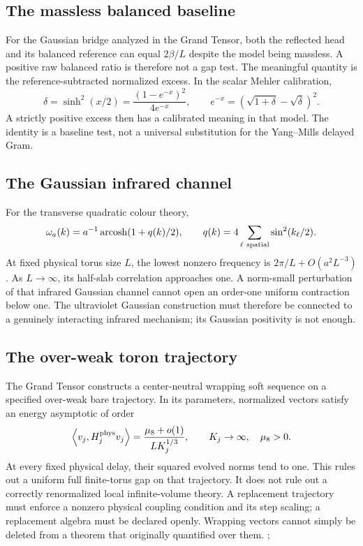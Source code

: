 \documentclass[11pt,oneside,openany]{book}
\theoremstyle{definition}
\theoremstyle{remark}
\newcommand{\ip}[2]{\left\langle#1,#2\right\rangle}
\newcommand{\src}[2]{\cite[#2]{#1}}
\begin{document}
\subsection{The massless balanced baseline}
For the Gaussian bridge analyzed in the Grand Tensor, both the reflected head and its balanced reference can equal $2\beta/L$ despite the model being massless. A positive raw balanced ratio is therefore not a gap test. The meaningful quantity is the reference-subtracted normalized excess. In the scalar Mehler calibration,
\[
\delta=\sinh^2(x/2)=\frac{(1-e^{-x})^2}{4e^{-x}},
\qquad
e^{-x}=(\sqrt{1+\delta}-\sqrt\delta)^2.
\]
A strictly positive excess then has a calibrated meaning in that model. The identity is a baseline test, not a universal substitution for the Yang--Mills delayed Gram. \cite{GT}

\subsection{The Gaussian infrared channel}
For the transverse quadratic colour theory,
\[
\omega_a(k)=a^{-1}\operatorname{arcosh}(1+q(k)/2),\qquad
q(k)=4\sum_{\ell\ {\rm spatial}}\sin^2(k_\ell/2).
\]
At fixed physical torus size $L$, the lowest nonzero frequency is $2\pi/L+O(a^2L^{-3})$. As $L\to\infty$, its half-slab correlation approaches one. A norm-small perturbation of that infrared Gaussian channel cannot open an order-one uniform contraction below one. The ultraviolet Gaussian construction must therefore be connected to a genuinely interacting infrared mechanism; its Gaussian positivity is not enough. \cite{GT}

\subsection{The over-weak toron trajectory}
The Grand Tensor constructs a center-neutral wrapping soft sequence on a specified over-weak bare trajectory. In its parameters, normalized vectors satisfy an energy asymptotic of order
\[
\ip{v_j}{H_j^{\rm phys}v_j}
=\frac{\mu_8+o(1)}{LK_j^{1/3}},\qquad K_j\to\infty,\quad\mu_8>0.
\]
At every fixed physical delay, their squared evolved norms tend to one. This rules out a uniform full finite-torus gap on that trajectory. It does not rule out a correctly renormalized local infinite-volume theory. A replacement trajectory must enforce a nonzero physical coupling condition and its step scaling; a replacement algebra must be declared openly. Wrapping vectors cannot simply be deleted from a theorem that originally quantified over them. \cite{GT}; \src{F1}{V1}
\end{document}
